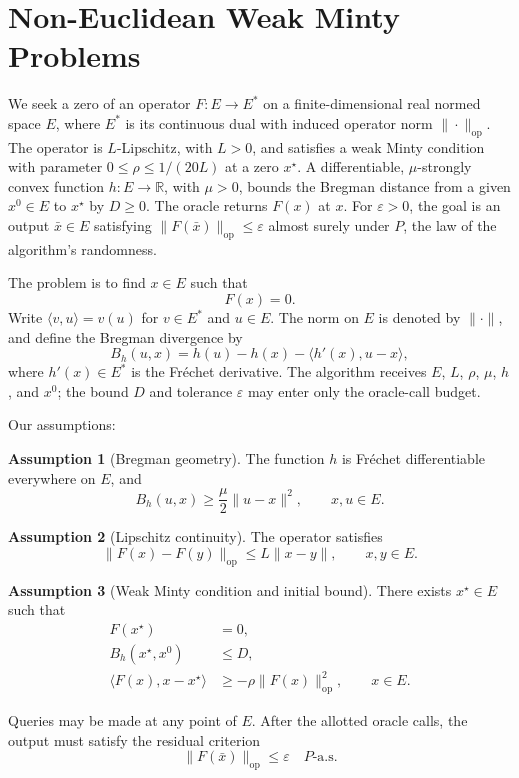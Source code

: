 \documentclass[10pt]{article}
\theoremstyle{definition}
\newtheorem{assumption}{Assumption}
\begin{document}
\section*{Non-Euclidean Weak Minty Problems}
We seek a zero of an operator $F:E\to E^*$ on a finite-dimensional real normed space $E$, where $E^*$ is its continuous dual with induced operator norm $\|\cdot\|_{\mathrm{op}}$. The operator is $L$-Lipschitz, with $L>0$, and satisfies a weak Minty condition with parameter $0\leq\rho\leq 1/(20L)$ at a zero $x^\star$. A differentiable, $\mu$-strongly convex function $h:E\to\mathbb{R}$, with $\mu>0$, bounds the Bregman distance from a given $x^0\in E$ to $x^\star$ by $D\geq0$. The oracle returns $F(x)$ at $x$. For $\varepsilon>0$, the goal is an output $\bar{x}\in E$ satisfying $\|F(\bar{x})\|_{\mathrm{op}}\leq\varepsilon$ almost surely under $P$, the law of the algorithm's randomness.

The problem is to find $x\in E$ such that
\[
F(x)=0.
\]
Write $\langle v,u\rangle=v(u)$ for $v\in E^*$ and $u\in E$. The norm on $E$ is denoted by $\|\cdot\|$, and define the Bregman divergence by
\[
B_h(u,x)=h(u)-h(x)-\langle h'(x),u-x\rangle,
\]
where $h'(x)\in E^*$ is the Fr\'echet derivative. The algorithm receives $E$, $L$, $\rho$, $\mu$, $h$, and $x^0$; the bound $D$ and tolerance $\varepsilon$ may enter only the oracle-call budget.

Our assumptions:
\begin{assumption}[Bregman geometry]
The function $h$ is Fr\'echet differentiable everywhere on $E$, and
\[
B_h(u,x)\geq\frac{\mu}{2}\|u-x\|^2,
\qquad x,u\in E.
\]
\end{assumption}

\begin{assumption}[Lipschitz continuity]
The operator satisfies
\[
\|F(x)-F(y)\|_{\mathrm{op}}\leq L\|x-y\|,
\qquad x,y\in E.
\]
\end{assumption}

\begin{assumption}[Weak Minty condition and initial bound]
There exists $x^\star\in E$ such that
\[
\begin{aligned}
F(x^\star)&=0,\\
B_h(x^\star,x^0)&\leq D,\\
\langle F(x),x-x^\star\rangle
&\geq-\rho\|F(x)\|_{\mathrm{op}}^2,
\qquad x\in E.
\end{aligned}
\]
\end{assumption}

Queries may be made at any point of $E$. After the allotted oracle calls, the output must satisfy the residual criterion
\[
\|F(\bar{x})\|_{\mathrm{op}}\leq\varepsilon
\quad P\text{-a.s.}
\]
\end{document}
